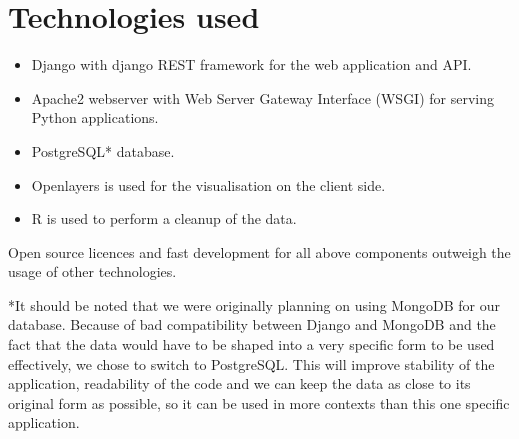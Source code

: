\section{Technologies used}

\begin{itemize}
	\item Django with django REST framework for the web application and API.
	\item Apache2 webserver with Web Server Gateway Interface (WSGI) for serving Python applications.
  \item PostgreSQL* database.
  \item Openlayers is used for the visualisation on the client side. \cite{openlayers}
  \item R is used to perform a cleanup of the data.
\end{itemize}

Open source licences and fast development for all above components outweigh the usage of other technologies.

*It should be noted that we were originally planning on using MongoDB for our database. Because of bad compatibility between Django and MongoDB and the fact that the data would have to be shaped into a very specific form to be used effectively, we chose to switch to PostgreSQL.
This will improve stability of the application, readability of the code and we can keep the data as close to its original form as possible, so it can be used in more contexts than this one specific application.

